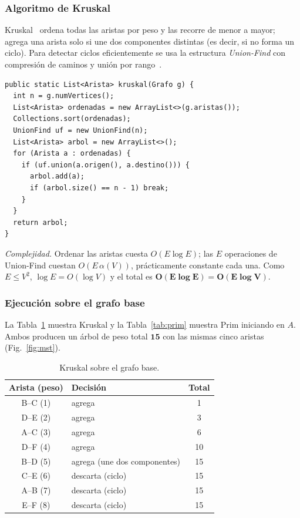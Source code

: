 \documentclass[conference]{IEEEtran}
\begin{document}
\subsubsection{Algoritmo de Kruskal}
Kruskal~\cite{kruskal} ordena todas las aristas por peso y las recorre de menor a mayor; agrega una arista solo si une dos componentes distintas (es decir, si no forma un ciclo). Para detectar ciclos eficientemente se usa la estructura \emph{Union-Find} con compresión de caminos y unión por rango~\cite{tarjan75}.

\begin{lstlisting}[caption={Kruskal (ArbolExpansionMinima.java)}]
public static List<Arista> kruskal(Grafo g) {
  int n = g.numVertices();
  List<Arista> ordenadas = new ArrayList<>(g.aristas());
  Collections.sort(ordenadas);
  UnionFind uf = new UnionFind(n);
  List<Arista> arbol = new ArrayList<>();
  for (Arista a : ordenadas) {
    if (uf.union(a.origen(), a.destino())) {
      arbol.add(a);
      if (arbol.size() == n - 1) break;
    }
  }
  return arbol;
}
\end{lstlisting}

\emph{Complejidad.} Ordenar las aristas cuesta $O(E\log E)$; las $E$ operaciones de Union-Find cuestan $O(E\,\alpha(V))$, prácticamente constante cada una. Como $E\le V^2$, $\log E = O(\log V)$ y el total es $\mathbf{O(E\log E)=O(E\log V)}$.

\subsubsection{Ejecución sobre el grafo base}
La Tabla~\ref{tab:kruskal} muestra Kruskal y la Tabla~\ref{tab:prim} muestra Prim iniciando en $A$. Ambos producen un árbol de peso total $\mathbf{15}$ con las mismas cinco aristas (Fig.~\ref{fig:mst}).

\begin{table}[h]
\caption{Kruskal sobre el grafo base.}
\label{tab:kruskal}
\centering
\small
\begin{tabular}{clc}
\toprule
\textbf{Arista (peso)} & \textbf{Decisión} & \textbf{Total} \\
\midrule
B--C (1) & agrega & 1 \\
D--E (2) & agrega & 3 \\
A--C (3) & agrega & 6 \\
D--F (4) & agrega & 10 \\
B--D (5) & agrega (une dos componentes) & 15 \\
C--E (6) & descarta (ciclo) & 15 \\
A--B (7) & descarta (ciclo) & 15 \\
E--F (8) & descarta (ciclo) & 15 \\
\bottomrule
\end{tabular}
\end{table}
\end{document}
